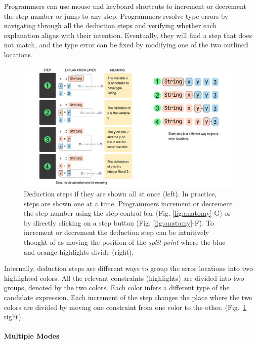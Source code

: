 Programmers can use mouse and keyboard shortcuts to increment or decrement the step number or jump to any step. Programmers resolve type errors by navigating through all the deduction steps and verifying whether each explanation aligns with their intention. Eventually, they will find a step that does not match, and the type error can be fixed by modifying one of the two outlined locations.

\begin{figure}
    \centering
    \includegraphics[width=\linewidth, trim=0mm 10mm 0mm 0mm]{images/step-interface.pdf}
    \caption{
Deduction steps if they are shown all at once (left). In practice, steps are shown one at a time. Programmers increment or decrement the step number using the step control bar (Fig. \ref{fig:anatomy}-G) or by directly clicking on a step button (Fig. \ref{fig:anatomy}-F). To increment or decrement the deduction step can be intuitively thought of as moving the position of the \textit{split point} where the blue and orange highlights divide (right).
        }
    \label{fig:step-interface}
\end{figure}

Internally, deduction steps are different ways to group the error locations into two highlighted colors. All the relevant constraints (highlights) are divided into two groups, denoted by the two colors. Each color infers a different type of the candidate expression. Each increment of the step changes the place where the two colors are divided by moving one constraint from one color to the other.  (Fig.~\ref{fig:step-interface} right).


\paragraph{Multiple Modes}

